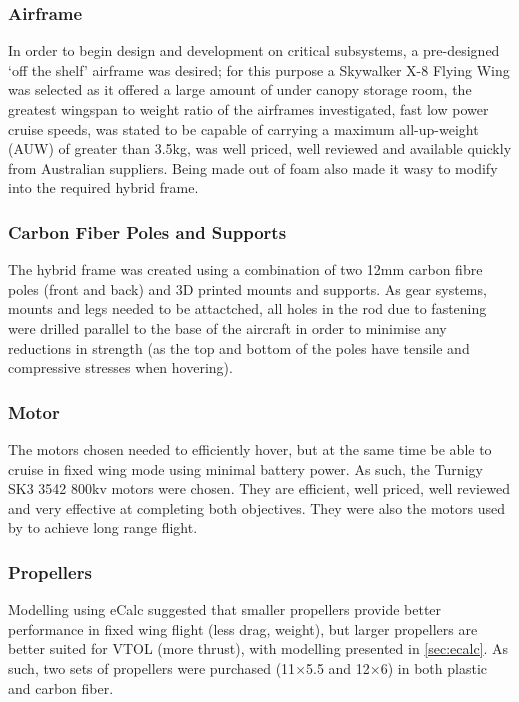 \subsubsection*{Airframe}
In order to begin design and development on critical subsystems, a pre-designed `off the shelf' airframe was desired; for this purpose a Skywalker X-8 Flying Wing was selected as it offered a large amount of under canopy storage room, the greatest wingspan to weight ratio of the airframes investigated, fast low power cruise speeds, was stated to be capable of carrying a maximum all-up-weight (AUW) of greater than 3.5kg, was well priced, well reviewed and available quickly from Australian suppliers. Being made out of foam also made it wasy to modify into the required hybrid frame.
		
		
\subsubsection*{Carbon Fiber Poles and Supports}
The hybrid frame was created using a combination of two 12mm carbon fibre poles (front and back) and 3D printed mounts and supports. As gear systems, mounts and legs needed to be attactched, all holes in the rod due to fastening were drilled parallel to the base of the aircraft in order to minimise any reductions in strength (as the top and bottom of the poles have tensile and compressive stresses when hovering).
	
\subsubsection*{Motor}
The motors chosen needed to efficiently hover, but at the same time be able to cruise in fixed wing mode using minimal battery power. As such, the Turnigy SK3 3542 800kv motors were chosen. They are efficient, well priced, well reviewed and very effective at completing both objectives. They were also the motors used by  to achieve long range flight.
	
\subsubsection*{Propellers}
Modelling using eCalc suggested that smaller propellers provide better performance in fixed wing flight (less drag, weight), but larger propellers are better suited for VTOL (more thrust), with modelling presented in \ref{sec:ecalc}. As such, two sets of propellers were purchased (11$\times$5.5 and 12$\times$6) in both plastic and carbon fiber.
	
